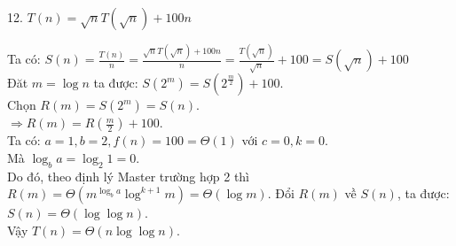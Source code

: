 \documentclass[12pt, a4paper, fleqn]{article}
\begin{document}
		12. $T(n) = \sqrt{n} T\left( \sqrt{n} \right) + 100n$
		
		Ta có: $\displaystyle
		S(n) = \frac{T(n)}{n} = \frac{\sqrt{n} T\left( \sqrt{n} \right) + 100n}{n} = \frac{T\left( \sqrt{n} \right)}{\sqrt{n}} + 100 = S \left( \sqrt{n} \right) + 100$\\
		Đăt $m = \log n$ ta được: $\displaystyle
		S(2 ^ m) = S\left(2 ^ {\frac{m}{2}}\right) + 100$.\\
		Chọn $R(m) = S(2 ^ m) = S(n)$.\\
		$\displaystyle
		\Rightarrow R(m) = R \left( \frac{m}{2} \right) + 100$.\\
		Ta có: $a = 1, b = 2, f(n) = 100 = \Theta (1)$ với $c = 0, k = 0$.\\
		Mà $\log_{b} a = \log_{2} 1 = 0$.\\
		Do đó, theo định lý Master trường hợp 2 thì $R(m) = \Theta \left( m^{\log_{b} a} \log^{k + 1} m \right) = \Theta (\log m)$.
		Đổi $R(m)$ về $S(n)$, ta được: $S(n) = \Theta (\log{\log n})$.\\
		Vậy $T(n) = \Theta (n \log{\log n})$.
		
		
\end{document}
